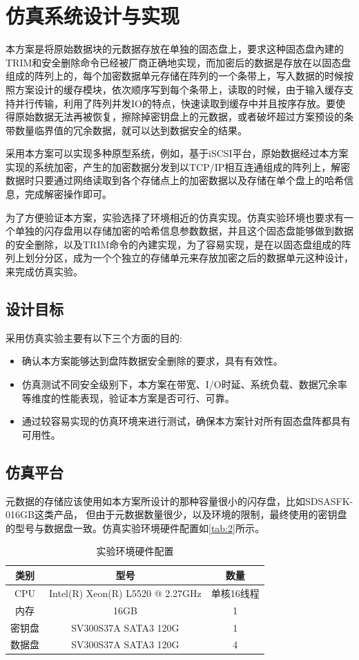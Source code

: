 \chapter{仿真系统设计与实现}
本方案是将原始数据块的元数据存放在单独的固态盘上，要求这种固态盘內建的TRIM和安全删除命令已经被厂商正确地实现，而加密后的数据是存放在以固态盘组成的阵列上的，每个加密数据单元存储在阵列的一个条带上，写入数据的时候按照方案设计的缓存模块，依次顺序写到每个条带上，读取的时候，由于输入缓存支持并行传输，利用了阵列并发IO的特点，快速读取到缓存中并且按序存放。要使得原始数据无法再被恢复，擦除掉密钥盘上的元数据，或者破坏超过方案预设的条带数量临界值的冗余数据，就可以达到数据安全的结果。


采用本方案可以实现多种原型系统，例如，基于iSCSI平台，原始数据经过本方案实现的系统加密，产生的加密数据分发到以TCP/IP相互连通组成的阵列上，解密数据时只要通过网络读取到各个存储点上的加密数据以及存储在单个盘上的哈希信息，完成解密操作即可。


为了方便验证本方案，实验选择了环境相近的仿真实现。仿真实验环境也要求有一个单独的闪存盘用以存储加密的哈希信息参数数据，并且这个固态盘能够做到数据的安全删除，以及TRIM命令的內建实现，为了容易实现，是在以固态盘组成的阵列上划分分区，成为一个个独立的存储单元来存放加密之后的数据单元这种设计，来完成仿真实验。
\section{设计目标}
采用仿真实验主要有以下三个方面的目的:
\begin{itemize}
	\item 确认本方案能够达到盘阵数据安全删除的要求，具有有效性。
	\item 仿真测试不同安全级别下，本方案在带宽、I/O时延、系统负载、数据冗余率等维度的性能表现，验证本方案是否可行、可靠。
	\item 通过较容易实现的仿真环境来进行测试，确保本方案针对所有固态盘阵都具有可用性。
\end{itemize}
\section{仿真平台}
元数据的存储应该使用如本方案所设计的那种容量很小的闪存盘，比如SDSASFK-016GB这类产品，
但由于元数据数量很少，以及环境的限制，最终使用的密钥盘的型号与数据盘一致。仿真实验环境硬件配置如\autoref{tab:2}所示。
\begin{table}[H]
    \centering
    \caption{实验环境硬件配置}
    \label{tab:2}
    \begin{tabular}{|c|c|c|}
        \hline
        类别 & 型号 & 数量 \\ \hline
        CPU & Intel(R) Xeon(R) L5520  @ 2.27GHz & 单核16线程 \\ \hline
        内存 & 16GB & 1 \\ \hline
        密钥盘 & SV300S37A SATA3 120G & 1 \\ \hline
        数据盘 & SV300S37A SATA3 120G & 4 \\ \hline
    \end{tabular}
\end{table}
